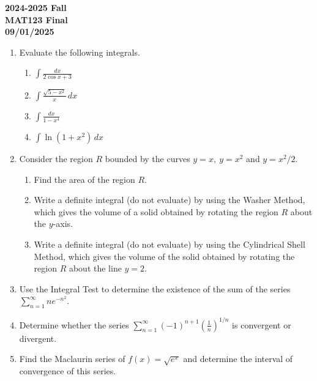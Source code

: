 \documentclass[a4paper, 12pt]{article}
\renewcommand{\headrulewidth}{0pt}
\begin{document}
\pagestyle{empty}

\begin{center}
\textbf{2024-2025 Fall\\MAT123 Final\\09/01/2025}
\end{center}

\begin{enumerate}[leftmargin=*,label=\textbf{\arabic*.}]
\item Evaluate the following integrals.

\begin{enumerate}[leftmargin=*,label=\textbf{\alph*.}]
\item $\displaystyle\int\frac{dx}{2\cos x+3}$
\item $\displaystyle\int\frac{\sqrt{5-x^2}}{x}\,dx$
\item $\displaystyle\int\frac{dx}{1-x^4}$
\item $\displaystyle\int\ln\left(1+x^2\right)\,dx$
\end{enumerate}

\item Consider the region $R$ bounded by the curves $y=x,\:y=x^2$ and $y=x^2/2$.
\begin{enumerate}[leftmargin=*,label=\textbf{\alph*.}]
\item Find the area of the region $R$.
\item Write a definite integral (do not evaluate) by using the Washer Method, which gives the volume of a solid obtained by rotating the region $R$ about the $y$-axis.
\item Write a definite integral (do not evaluate) by using the Cylindrical Shell Method, which gives the volume of the solid obtained by rotating the region $R$ about the line $y=2$.
\end{enumerate}

\item Use the Integral Test to determine the existence of the sum of the series $\displaystyle\sum_{n=1}^\infty n e^{-n^2}$.

\item Determine whether the series $\displaystyle\sum_{n=1}^\infty(-1)^{n+1}\left(\frac1n\right)^{1/n}$ is convergent or divergent.

\item Find the Maclaurin series of $f(x)=\sqrt{ e^x}$ and determine the interval of convergence of this series.
\end{enumerate}

\newpage
\pagestyle{fancy}
\renewcommand{\headrulewidth}{1pt}
\end{document}
